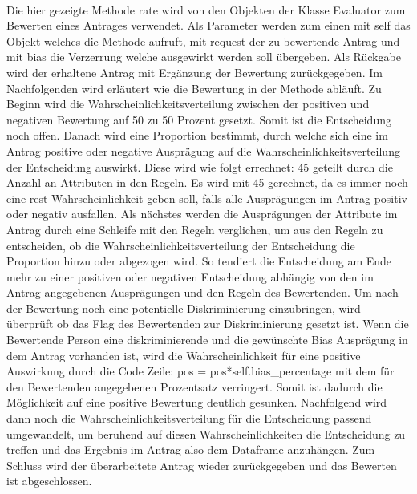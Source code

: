 \begin{onehalfspace}
\begin{figure}[h]
\end{figure}\\
Die hier gezeigte Methode \glqq{}rate\grqq{} wird von den Objekten der Klasse \glqq{}Evaluator\grqq{} zum Bewerten eines Antrages verwendet. Als Parameter werden zum einen mit \glqq{}self\grqq{} das Objekt welches die Methode aufruft, mit \glqq{}request\grqq{} der zu bewertende Antrag und mit \glqq{}bias\grqq{} die Verzerrung welche ausgewirkt werden soll übergeben. Als Rückgabe wird der erhaltene Antrag mit Ergänzung der Bewertung zurückgegeben. Im Nachfolgenden wird erläutert wie die Bewertung in der Methode abläuft.
Zu Beginn wird die Wahrscheinlichkeitsverteilung zwischen der positiven und negativen Bewertung auf 50 zu 50 Prozent gesetzt. Somit ist die Entscheidung noch offen. Danach wird eine Proportion bestimmt, durch welche sich eine im Antrag positive oder negative Ausprägung auf die Wahrscheinlichkeitsverteilung der Entscheidung auswirkt. Diese wird wie folgt errechnet: 45 geteilt durch die Anzahl an Attributen in den Regeln. Es wird mit 45 gerechnet, da es immer noch eine rest Wahrscheinlichkeit geben soll, falls alle Ausprägungen im Antrag positiv oder negativ ausfallen. Als nächstes werden die Ausprägungen der Attribute im Antrag durch eine Schleife mit den Regeln verglichen, um aus den Regeln zu entscheiden, ob die Wahrscheinlichkeitsverteilung der Entscheidung die Proportion hinzu oder abgezogen wird. So tendiert die Entscheidung am Ende mehr zu einer positiven oder negativen Entscheidung abhängig von den im Antrag angegebenen Ausprägungen und den Regeln des Bewertenden. Um nach der Bewertung noch eine potentielle Diskriminierung einzubringen, wird überprüft ob das Flag des Bewertenden zur Diskriminierung gesetzt ist. Wenn die Bewertende Person eine diskriminierende und die gewünschte Bias Ausprägung in dem Antrag vorhanden ist, wird die Wahrscheinlichkeit für eine positive Auswirkung durch die Code Zeile: \glqq{}pos = pos*self.bias\_percentage\grqq{} mit dem für den Bewertenden angegebenen Prozentsatz verringert. Somit ist dadurch die Möglichkeit auf eine positive Bewertung deutlich gesunken. Nachfolgend wird dann noch die Wahrscheinlichkeitsverteilung für die Entscheidung passend umgewandelt, um beruhend auf diesen Wahrscheinlichkeiten die Entscheidung zu treffen und das Ergebnis im Antrag also dem Dataframe anzuhängen. Zum Schluss wird der überarbeitete Antrag wieder zurückgegeben und das Bewerten ist abgeschlossen.\\

\end{onehalfspace}
